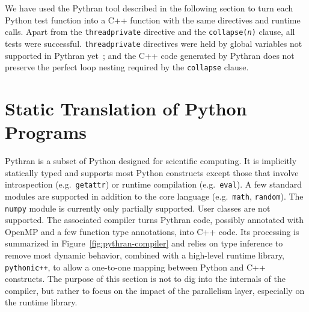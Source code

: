 \documentclass{sigplanconf}
\begin{document}
We have used the Pythran tool described in the following section to turn each
Python test function into a C++ function with the same directives and runtime
calls. Apart from the \texttt{threadprivate} directive and the
\texttt{collapse(\emph{n})} clause, all tests were successful.
\texttt{threadprivate} directives were held by global variables not supported in
Pythran yet~; and the C++ code generated by Pythran does not preserve the perfect
loop nesting required by the \texttt{collapse} clause.

\section{Static Translation of Python Programs}\label{sec:python-static}

Pythran is a subset of Python designed for scientific computing. It is
implicitly statically typed and supports most Python constructs except those
that involve introspection (e.g.\ \texttt{getattr}) or runtime compilation
(e.g.\ \texttt{eval}). A few standard modules are supported in addition to the
core language (e.g.\ \texttt{math}, \texttt{random}). The \texttt{numpy} module
is currently only partially supported. User classes are not supported. The
associated compiler turns Pythran code, possibly annotated with OpenMP and a few
function type annotations, into C++ code. Its processing is summarized in
Figure~\ref{fig:pythran-compiler} and relies on type inference to remove most
dynamic behavior, combined with a high-level runtime library,
\texttt{pythonic++}, to allow a one-to-one mapping between Python and C++
constructs. The purpose of this section is not to dig into the internals of the
compiler, but rather to focus on the impact of the parallelism layer, especially
on the runtime library.
\end{document}
